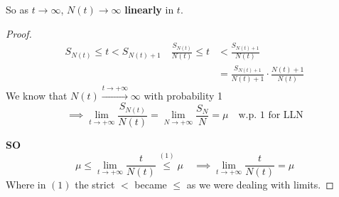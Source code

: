 So as $t \to\infty$, $N(t)\to\infty$ \textbf{linearly} in $t$.
 \begin{proof}
   \begin{equation}
     \begin{split}
       S_{N(t)} \le t < S_{N(t)+1} \quad \frac{S_{N(t)}}{N(t)} \le t &< \frac{S_{N(t)+1}}{N(t)}\\
       &=\frac{S_{N(t)+1}}{N(t)+1} \cdot \frac{N(t)+1}{N(t)}
     \end{split}
   \end{equation}
   We know that $N(t)\xrightarrow{t\to +\infty} \infty$ with probability 1
   $$\implies \lim_{t \to +\infty} \frac{S_{N(t)}}{N(t)} =\lim_{N \to +\infty} \frac{S_{N}}{N} = \mu \quad \text{w.p. 1 for LLN}$$ 

\textbf{SO}
\begin{equation}
  \mu \le \lim_{t \to +\infty} \frac{t}{N(t)} \stackrel{(1)}{\le}\mu \quad \implies \lim_{t \to +\infty} \frac{t}{N(t)} = \mu
\end{equation}
Where in $(1)$ the strict $<$ became $\le$ as we were dealing with limits.
 \end{proof}


